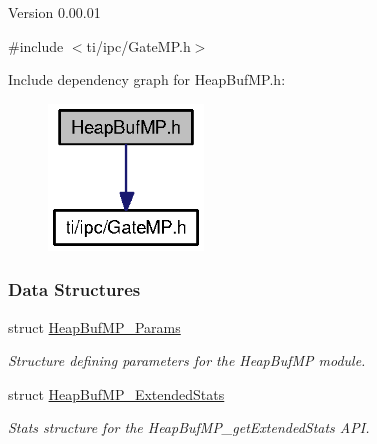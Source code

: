 \begin{DoxyVersion}{Version}
0.00.01 
\end{DoxyVersion}
{\ttfamily \#include $<$ti/ipc/GateMP.h$>$}\par
Include dependency graph for HeapBufMP.h:
\nopagebreak
\begin{figure}[H]
\begin{center}
\leavevmode
\includegraphics[width=117pt]{_heap_buf_m_p_8h__incl}
\end{center}
\end{figure}
\subsubsection*{Data Structures}
\begin{DoxyCompactItemize}
\item 
struct \hyperlink{struct_heap_buf_m_p___params}{HeapBufMP\_\-Params}
\begin{DoxyCompactList}\small\item\em Structure defining parameters for the HeapBufMP module. \item\end{DoxyCompactList}\item 
struct \hyperlink{struct_heap_buf_m_p___extended_stats}{HeapBufMP\_\-ExtendedStats}
\begin{DoxyCompactList}\small\item\em Stats structure for the HeapBufMP\_\-getExtendedStats API. \item\end{DoxyCompactList}\end{DoxyCompactItemize}
